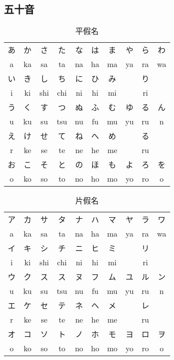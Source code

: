 \documentclass[12pt]{article}
\begin{document}
\begin{CJK}{UTF8}{nsung}
\renewcommand{\contentsname}{目錄}
\renewcommand{\tablename}{表}
\renewcommand{\figurename}{圖}
\renewcommand{\listtablename}{表格目錄}
\renewcommand{\listfigurename}{圖目錄}

\tableofcontents
\newpage


\section{五十音}

\begin{table}[htdp]
\caption{平假名}
\begin{tabular}{cccccccccc}
\hline
あ& か & さ & た & な & は & ま & や & ら & わ\\
a & ka & sa & ta & na & ha & ma& ya & ra & wa\\
\hline
い & き & し & ち & に & ひ & み & & り& \\
i & ki & shi & chi & ni & hi & mi & & ri& \\
\hline
う & く  & す & つ & ぬ & ふ & む & ゆ & る & ん\\	
 u & ku &  su &  tsu &  nu &  fu &  mu &  yu &  ru & n\\	
\hline
え & け & せ & て & ね & へ & め & & る & \\	
 r & ke &  se &  te &  ne &  he &  me & &  ru & \\	
\hline
お & こ  & そ & と & の & ほ & も & よ & ろ & を\\	
 o &  ko &  so &  to &  no &  ho &  mo &  yo &  ro & o\\	

\hline
\end{tabular}
\end{table}


\begin{table}[htdp]
\caption{片假名}
\begin{tabular}{cccccccccc}
\hline
ア& カ & サ & タ & ナ & ハ & マ & ヤ & ラ & ワ\\
a & ka & sa & ta & na & ha & ma& ya & ra & wa\\
\hline
イ& キ & シ & チ & ニ & ヒ & ミ &  & リ & \\
i & ki & shi & chi & ni & hi & mi & & ri& \\
\hline
ウ& ク & ス & ス & ヌ & フ & ム & ユ & ル & ン\\
 u & ku &  su &  tsu &  nu &  fu &  mu &  yu &  ru & n\\	
\hline
エ& ケ & セ & テ & ネ & ヘ & メ & & レ & \\
 r & ke &  se &  te &  ne &  he &  me & &  ru & \\	
\hline
オ& コ & ソ & ト & ノ & ホ & モ & ヨ & ロ & ヲ\\
 o &  ko &  so &  to &  no &  ho &  mo &  yo &  ro & o\\	


\end{tabular}
\end{table}
\end{CJK}
\end{document}
